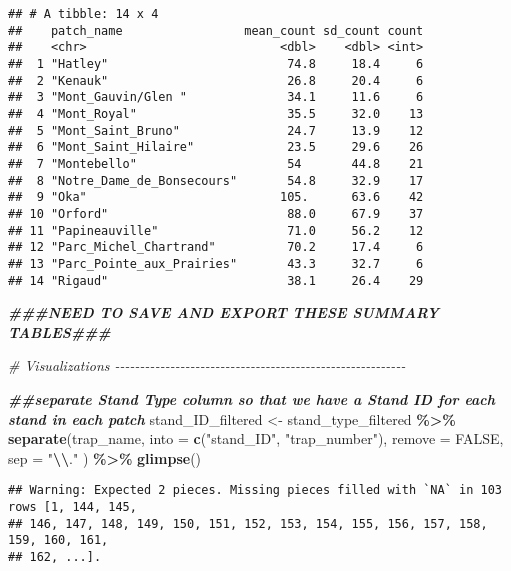 \documentclass[
]{article}
\newenvironment{Shaded}{\begin{snugshade}}{\end{snugshade}}
\newcommand{\AttributeTok}[1]{\textcolor[rgb]{0.13,0.29,0.53}{#1}}
\newcommand{\CommentTok}[1]{\textcolor[rgb]{0.56,0.35,0.01}{\textit{#1}}}
\newcommand{\ConstantTok}[1]{\textcolor[rgb]{0.56,0.35,0.01}{#1}}
\newcommand{\DocumentationTok}[1]{\textcolor[rgb]{0.56,0.35,0.01}{\textbf{\textit{#1}}}}
\newcommand{\FunctionTok}[1]{\textcolor[rgb]{0.13,0.29,0.53}{\textbf{#1}}}
\newcommand{\NormalTok}[1]{#1}
\newcommand{\OtherTok}[1]{\textcolor[rgb]{0.56,0.35,0.01}{#1}}
\newcommand{\SpecialCharTok}[1]{\textcolor[rgb]{0.81,0.36,0.00}{\textbf{#1}}}
\newcommand{\StringTok}[1]{\textcolor[rgb]{0.31,0.60,0.02}{#1}}
\begin{document}
\begin{verbatim}
## # A tibble: 14 x 4
##    patch_name                 mean_count sd_count count
##    <chr>                           <dbl>    <dbl> <int>
##  1 "Hatley"                         74.8     18.4     6
##  2 "Kenauk"                         26.8     20.4     6
##  3 "Mont_Gauvin/Glen "              34.1     11.6     6
##  4 "Mont_Royal"                     35.5     32.0    13
##  5 "Mont_Saint_Bruno"               24.7     13.9    12
##  6 "Mont_Saint_Hilaire"             23.5     29.6    26
##  7 "Montebello"                     54       44.8    21
##  8 "Notre_Dame_de_Bonsecours"       54.8     32.9    17
##  9 "Oka"                           105.      63.6    42
## 10 "Orford"                         88.0     67.9    37
## 11 "Papineauville"                  71.0     56.2    12
## 12 "Parc_Michel_Chartrand"          70.2     17.4     6
## 13 "Parc_Pointe_aux_Prairies"       43.3     32.7     6
## 14 "Rigaud"                         38.1     26.4    29
\end{verbatim}

\begin{Shaded}
\begin{Highlighting}[]
\DocumentationTok{\#\#\#NEED TO SAVE AND EXPORT THESE SUMMARY TABLES\#\#\#}


\CommentTok{\# Visualizations {-}{-}{-}{-}{-}{-}{-}{-}{-}{-}{-}{-}{-}{-}{-}{-}{-}{-}{-}{-}{-}{-}{-}{-}{-}{-}{-}{-}{-}{-}{-}{-}{-}{-}{-}{-}{-}{-}{-}{-}{-}{-}{-}{-}{-}{-}{-}{-}{-}{-}{-}{-}{-}{-}{-}{-}{-}{-}}

\DocumentationTok{\#\#separate Stand Type column so that we have a Stand ID for each stand in each patch}
\NormalTok{stand\_ID\_filtered }\OtherTok{\textless{}{-}}\NormalTok{ stand\_type\_filtered }\SpecialCharTok{\%\textgreater{}\%} 
  \FunctionTok{separate}\NormalTok{(trap\_name, }\AttributeTok{into =} \FunctionTok{c}\NormalTok{(}\StringTok{"stand\_ID"}\NormalTok{, }\StringTok{"trap\_number"}\NormalTok{), }\AttributeTok{remove =} \ConstantTok{FALSE}\NormalTok{, }\AttributeTok{sep =} \StringTok{"}\SpecialCharTok{\textbackslash{}\textbackslash{}}\StringTok{."}\NormalTok{ ) }\SpecialCharTok{\%\textgreater{}\%} 
  \FunctionTok{glimpse}\NormalTok{()}
\end{Highlighting}
\end{Shaded}

\begin{verbatim}
## Warning: Expected 2 pieces. Missing pieces filled with `NA` in 103 rows [1, 144, 145,
## 146, 147, 148, 149, 150, 151, 152, 153, 154, 155, 156, 157, 158, 159, 160, 161,
## 162, ...].
\end{verbatim}
\end{document}
